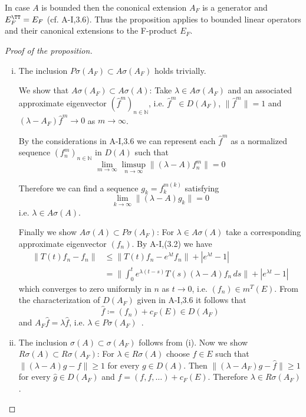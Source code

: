\begin{remark}
	In case $A$ is bounded then the cononical extension $A_F$ is a generator and $E_{F}^{\TT} = E_{F}$ (cf. A-I,3.6).
	Thus the proposition applies to bounded linear operators and their canonical extensions to the F-product $E_{F}$.
\end{remark}

\begin{proof}[Proof of the proposition]
	\begin{enumerate}[(i)]
		\item The inclusion $P\sigma(A_{F}) \subset A\sigma(A_{F})$ holds trivially.
		
		We show that $A\sigma(A_{F}) \subset A\sigma(A)$: Take $\lambda \in A\sigma(A_{F})$ and an associated approximate eigenvector $({\hat{f}^{m}})_{n \in \mathbb{N}}$, i.e. $\hat{f}^{m} \in D(A_{F})$, $\|\hat{f}^{m}\| = 1$ and $(\lambda-A_{F})\hat{f}^{m} \to 0$ as $m \to \infty$.
		
		By the considerations in A-I,3.6 we can represent each $\hat{f}^{m}$ as a normalized sequence $(f_{n}^{m})_{n \in \mathbb{N}}$ in $D(A)$ such that
		\[
		\lim_{m \to \infty} \limsup_{n \to \infty} \|(\lambda-A)f_{n}^{m}\| = 0
		\]
		
		Therefore we can find a sequence $g_{k} = f_{k}^{m(k)}$ satisfying
		\[
		\lim_{k \to \infty} \|(\lambda-A)g_{k}\| = 0
		\]
		i.e. $\lambda \in A\sigma(A)$.
		
		Finally we show $A\sigma(A) \subset P\sigma(A_{F})$: For $\lambda \in A\sigma(A)$ take a corresponding approximate eigenvector $(f_{n})$.
		By A-I,(3.2) we have
		\begin{align*}
			\|T(t)f_{n} - f_{n}\| &\leq \|T(t)f_{n} - e^{\lambda t}f_{n}\| + |e^{\lambda t} - 1| \\
			&= \|\int_{0}^{t} e^{\lambda(t-s)}T(s)(\lambda-A)f_{n} \, ds\| + |e^{\lambda t} -1|
		\end{align*}
		which converges to zero uniformly in $n$ as $t \to 0$, i.e. $(f_{n}) \in m^{T}(E)$.
		From the characterization of $D(A_{F})$ given in A-I,3.6 it follows that
		\[
		\hat{f} \coloneqq (f_{n}) + c_{F}(E) \in D(A_{F})
		\]
		and $A_{F}\hat{f} = \lambda\hat{f}$, i.e. $\lambda \in P\sigma(A_{F})$~.
		
		\item The inclusion $\sigma(A) \subset \sigma(A_{F})$ follows from (i). Now we show $R\sigma(A) \subset R\sigma(A_{F})$:
		For $\lambda \in R\sigma(A)$ choose $f \in E$ such that $\|(\lambda-A)g - f\| \geq 1$ for every $g \in D(A)$.
		Then $\|(\lambda-A_{F})g - \hat{f}\| \geq 1$ for every $\hat{g} \in D(A_{F})$ and $\hat{f} = (f,f,\ldots) + c_{F}(E)$.
		Therefore $\lambda \in R\sigma(A_{F})$.
		

\end{enumerate}
\end{proof}
